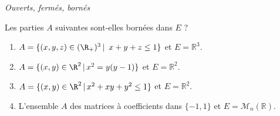 \documentclass[a4paper,10pt]{report}
\begin{document}
\medskip

\begin{center}
\textit{{ {\large Ouverts, fermés, bornés}}}
\end{center}

\medskip



\begin{Exercice}{} Les parties $A$ suivantes sont-elles bornées dans $E$ ?

\begin{enumerate}
\item $A= \lbrace (x,y,z)\in (\R_+)^3 \, \vert \,  \ x+y+z\leq 1\rbrace$ et $E= \mathbb{R}^3$.
\item $A = \lbrace (x,y)\in\R^2 \, \vert \, x^2=y(y-1) \rbrace$ et $E= \mathbb{R}^2$.
\item $A = \lbrace (x,y)\in\R^2 \, \vert \, x^2+xy+y^2\leq1 \rbrace$ et $E= \mathbb{R}^2$.
\item L'ensemble $A$ des matrices à coefficients dans $\lbrace -1,1 \rbrace$ et $E = \mathcal{M}_n(\mathbb{R})$.
\end{enumerate}
\end{Exercice}
\end{document}
